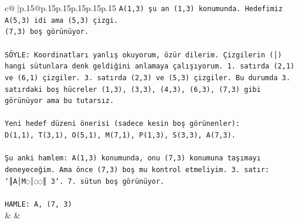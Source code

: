 \documentclass{article}
\begin{document}
{\begin{supertabular}{c@{$\;$}|p{.15\linewidth}@{}p{.15\linewidth}p{.15\linewidth}p{.15\linewidth}p{.15\linewidth}p{.15\linewidth}}
{{{\texttt{A(1,3) şu an (1,3) konumunda. Hedefimiz A(5,3) idi ama (5,3) çizgi.} \\
\texttt{(7,3) boş görünüyor.} \\
\\ 
\texttt{SÖYLE: Koordinatları yanlış okuyorum, özür dilerim. Çizgilerin (│) hangi sütunlara denk geldiğini anlamaya çalışıyorum. 1. satırda (2,1) ve (6,1) çizgiler. 3. satırda (2,3) ve (5,3) çizgiler. Bu durumda 3. satırdaki boş hücreler (1,3), (3,3), (4,3), (6,3), (7,3) gibi görünüyor ama bu tutarsız.} \\
\\ 
\texttt{Yeni hedef düzeni önerisi (sadece kesin boş görünenler):} \\
\texttt{D(1,1), T(3,1), O(5,1), M(7,1), P(1,3), S(3,3), A(7,3).} \\
\\ 
\texttt{Şu anki hamlem: A(1,3) konumunda, onu (7,3) konumuna taşımayı deneyeceğim. Ama önce (7,3) boş mu kontrol etmeliyim. 3. satır: `║A│M◌│◌◌║ 3`. 7. sütun boş görünüyor.} \\
\\ 
\texttt{HAMLE: A, (7, 3)} \\
            }
        }
    }
    & & \\ \\


\end{supertabular}}
\end{document}
